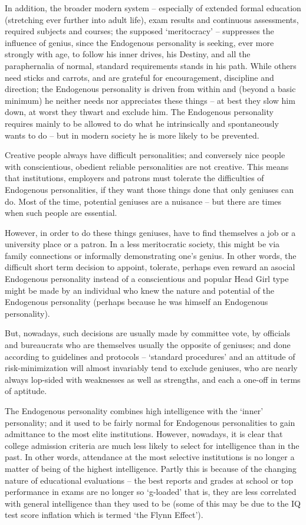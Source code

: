 \documentclass[
]{book}
\begin{document}
In addition, the broader modern system -- especially of extended formal education (stretching ever further into adult life), exam results and continuous assessments, required subjects and courses; the supposed `meritocracy' -- suppresses the influence of genius, since the Endogenous personality is seeking, ever more strongly with age, to follow his inner drives, his Destiny, and all the paraphernalia of normal, standard requirements stands in his path. While others need sticks and carrots, and are grateful for encouragement, discipline and direction; the Endogenous personality is driven from within and (beyond a basic minimum) he neither needs nor appreciates these things -- at best they slow him down, at worst they thwart and exclude him. The Endogenous personality requires mainly to be allowed to do what he intrinsically and spontaneously wants to do -- but in modern society he is more likely to be prevented.

Creative people always have difficult personalities; and conversely nice people with conscientious, obedient reliable personalities are not creative. This means that institutions, employers and patrons must tolerate the difficulties of Endogenous personalities, if they want those things done that only geniuses can do. Most of the time, potential geniuses are a nuisance -- but there are times when such people are essential.

However, in order to do these things geniuses, have to find themselves a job or a university place or a patron. In a less meritocratic society, this might be via family connections or informally demonstrating one's genius. In other words, the difficult short term decision to appoint, tolerate, perhaps even reward an asocial Endogenous personality instead of a conscientious and popular Head Girl type might be made by an individual who knew the nature and potential of the Endogenous personality (perhaps because he was himself an Endogenous personality).

But, nowadays, such decisions are usually made by committee vote, by officials and bureaucrats who are themselves usually the opposite of geniuses; and done according to guidelines and protocols -- `standard procedures' and an attitude of risk-minimization will almost invariably tend to exclude geniuses, who are nearly always lop-sided with weaknesses as well as strengths, and each a one-off in terms of aptitude.

The Endogenous personality combines high intelligence with the `inner' personality; and it used to be fairly normal for Endogenous personalities to gain admittance to the most elite institutions. However, nowadays, it is clear that college admission criteria are much less likely to select for intelligence than in the past. In other words, attendance at the most selective institutions is no longer a matter of being of the highest intelligence. Partly this is because of the changing nature of educational evaluations -- the best reports and grades at school or top performance in exams are no longer so `g-loaded' that is, they are less correlated with general intelligence than they used to be (some of this may be due to the IQ test score inflation which is termed `the Flynn Effect').
\end{document}
